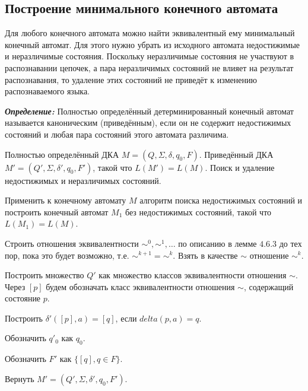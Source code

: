 \subsection*{Построение минимального конечного автомата}
Для любого конечного автомата можно найти эквивалентный ему минимальный конечный автомат. Для этого нужно убрать из исходного автомата недостижимые и неразличимые состояния. Поскольку неразличимые состояния не участвуют в распознавании цепочек, а пара неразличимых состояний не влияет на результат распознавания, то удаление этих состояний не приведёт к изменению распознаваемого языка.

\textbf{\textit{Определение:}} Полностью определённый детерминированный конечный автомат называется каноническим (приведённым), если он не содержит недостижимых состояний и любая пара состояний этого автомата различима.

{
	Полностью определённый ДКА $M = (Q,\Sigma, \delta, q_0, F)$.
}
{
	Приведённый ДКА $M' = (Q',\Sigma, \delta', q_0, F')$, такой что $L(M') = L(M)$.
}
{
	Поиск и удаление недостижимых и неразличимых состояний.
}
{
\item Применить к конечному автомату $M$ алгоритм поиска недостижимых состояний и построить конечный автомат $M_1$ без недостижимых состояний, такой что $L(M_1) = L(M)$.
\item Строить отношения эквивалентности $\sim^0, \sim^1, \ldots $ по описанию в лемме $4.6.3$ до тех пор, пока это будет возможно, т.е. $\sim^{k+1} = \sim^{k}$. Взять в качестве $\sim$ отношение $\sim^k$.
\item Построить множество $Q'$ как множество классов эквивалентности отношения $\sim$. Через $[p]$ будем обозначать класс эквивалентности отношения $\sim$, содержащий состояние $p$.
\item Построить $\delta'([p], a) = [q]$, если $delta(p,a) = q$.
\item Обозначить $q'_0$ как $q_0$.
\item Обозначить $F'$ как $\{ [q], q \in F \}$.
\item Вернуть  $M' = (Q',\Sigma, \delta', q_0, F')$.
}

